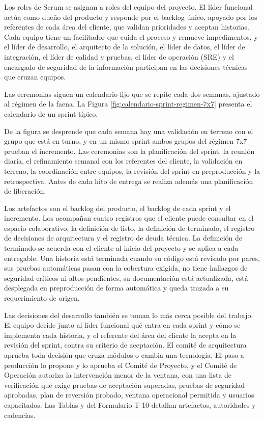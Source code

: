 \documentclass[subdoc]{../../comun/overfore}
\begin{document}
Los roles de Scrum se asignan a roles del equipo del proyecto. El líder funcional actúa como dueño del producto y responde por el backlog único, apoyado por los referentes de cada área del cliente, que validan prioridades y aceptan historias. Cada equipo tiene un facilitador que cuida el proceso y remueve impedimentos, y el líder de desarrollo, el arquitecto de la solución, el líder de datos, el líder de integración, el líder de calidad y pruebas, el líder de operación (SRE) y el encargado de seguridad de la información participan en las decisiones técnicas que cruzan equipos.

Las ceremonias siguen un calendario fijo que se repite cada dos semanas, ajustado al régimen de la faena. La Figura \ref{fig:calendario-sprint-regimen-7x7} presenta el calendario de un sprint típico.

De la figura se desprende que cada semana hay una validación en terreno con el grupo que está en turno, y en un mismo sprint ambos grupos del régimen 7x7 prueban el incremento. Las ceremonias son la planificación del sprint, la reunión diaria, el refinamiento semanal con los referentes del cliente, la validación en terreno, la coordinación entre equipos, la revisión del sprint en preproducción y la retrospectiva. Antes de cada hito de entrega se realiza además una planificación de liberación.

Los artefactos son el backlog del producto, el backlog de cada sprint y el incremento. Los acompañan cuatro registros que el cliente puede consultar en el espacio colaborativo, la definición de listo, la definición de terminado, el registro de decisiones de arquitectura y el registro de deuda técnica. La definición de terminado se acuerda con el cliente al inicio del proyecto y se aplica a cada entregable. Una historia está terminada cuando su código está revisado por pares, sus pruebas automáticas pasan con la cobertura exigida, no tiene hallazgos de seguridad críticos ni altos pendientes, su documentación está actualizada, está desplegada en preproducción de forma automática y queda trazada a su requerimiento de origen.

Las decisiones del desarrollo también se toman lo más cerca posible del trabajo. El equipo decide junto al líder funcional qué entra en cada sprint y cómo se implementa cada historia, y el referente del área del cliente la acepta en la revisión del sprint, contra su criterio de aceptación. El comité de arquitectura aprueba toda decisión que cruza módulos o cambia una tecnología. El paso a producción lo propone y lo aprueba el Comité de Proyecto, y el Comité de Operación autoriza la intervención menor de la ventana, con una lista de verificación que exige pruebas de aceptación superadas, pruebas de seguridad aprobadas, plan de reversión probado, ventana operacional permitida y usuarios capacitados. Las Tablas  y  del Formulario T-10 detallan artefactos, autoridades y cadencias.
\end{document}
